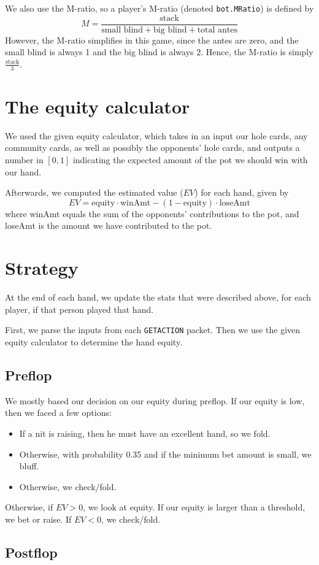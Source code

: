 \documentclass{article}
\begin{document}

We also use the M-ratio, so a player's M-ratio (denoted \texttt{bot.MRatio}) is defined by
\[ M = \frac{\text{stack}}{\text{small blind} + \text{big blind} + \text{total antes}} \]
However, the M-ratio simplifies in this game, since the antes are zero, and the small blind is always 1 and the big blind is always 2. Hence, the M-ratio is simply $\frac{\text{stack}}{3}$.

\section*{The equity calculator}
We used the given equity calculator, which takes in an input our hole cards, any community cards, as well as possibly the opponents' hole cards, and outputs a number in $[0,1]$ indicating the expected amount of the pot we should win with our hand.

Afterwards, we computed the estimated value ($EV$) for each hand, given by
\[ EV = \text{equity} \cdot \text{winAmt} - (1-\text{equity}) \cdot \text{loseAmt} \]
where winAmt equals the sum of the opponents' contributions to the pot, and loseAmt is the amount we have contributed to the pot.
\section*{Strategy}
At the end of each hand, we update the stats that were described above, for each player, if that person played that hand.

First, we parse the inputs from each \texttt{GETACTION} packet. Then we use the given equity calculator to determine the hand equity.

\subsection*{Preflop}
We mostly based our decision on our equity during preflop. If our equity is low, then we faced a few options:
\begin{itemize}
\item If a nit is raising, then he must have an excellent hand, so we fold.
\item Otherwise, with probability 0.35 and if the minimum bet amount is small, we bluff.
\item Otherwise, we check/fold.
\end{itemize}
Otherwise, if $EV > 0$, we look at equity. If our equity is larger than a threshold, we bet or raise. If $EV < 0$, we check/fold.

\subsection*{Postflop}
\end{document}
